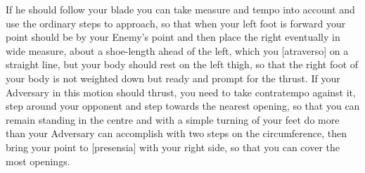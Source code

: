 
If he should follow your blade you can take measure and tempo into
account and use the ordinary steps to approach, so that when your left
foot is forward your point should be by your Enemy's point and then
place the right eventually in wide measure, about a shoe-length
ahead of the left, which you [atraverso] on a straight
line, but your body should rest on the left thigh, so that the right
foot of your body is not weighted down but ready and prompt for the
thrust. If your Adversary in this motion should thrust, you need to
take contratempo against it, step around your opponent and step
towards the nearest opening, so that you can remain standing in the
centre and with a simple turning of your feet do more than your
Adversary can accomplish with two steps on the circumference, then
bring your point to [presensia] with your right side, so that you can
cover the most openings.


